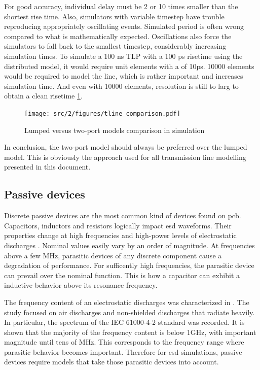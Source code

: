 For good accuracy, individual delay must be 2 or 10 times smaller than the shortest rise time.
Also, simulators with variable timestep have trouble reproducing appropriately oscillating events.
Simulated period is often wrong compared to what is mathematically expected.
Oscillations also force the simulators to fall back to the smallest timestep, considerably increasing simulation times.
To simulate a 100 ns TLP with a 100 ps risetime using the distributed model, it would require unit elements with a of 10ps.
10000 elements would be required to model the line, which is rather important and increases simulation time.
And even with 10000 elements, resolution is still to larg to obtain a clean risetime \ref{fig:lines-simulations}.

\begin{figure}[!h]
  \centering
  \texttt{[image: src/2/figures/tline\_comparison.pdf]}
  \caption{Lumped versus two-port models comparison in simulation}
  \label{fig:lines-simulations}
\end{figure}

In conclusion, the two-port model should always be preferred over the lumped model.
This is obviously the approach used for all transmission line modelling presented in this document.

\subsection{Passive devices}

Discrete passive devices are the most common kind of devices found on \gls{pcb}.
Capacitors, inductors and resistors logically impact \gls{esd} waveforms.
Their properties change at high frequencies and high-power levels of electrostatic discharges \cite{capa-esd-cz}.
Nominal values easily vary by an order of magnitude.
At frequencies above a few MHz, parasitic devices of any discrete component cause a degradation of performance.
For sufficently high frequencies, the parasitic device can prevail over the nominal function.
This is how a capacitor can exhibit a inductive behavior above its resonance frequency.

The frequency content of an electrostatic discharges was characterized in \cite{fft-esd}.
The study focused on air discharges and non-shielded discharges that radiate heavily.
In particular, the spectrum of the IEC 61000-4-2 standard \cite{iec61000-4-2} was recorded.
It is shown that the majority of the frequency content is below 1GHz, with important magnitude until tens of MHz.
This corresponds to the frequency range where parasitic behavior becomes important.
Therefore for \gls{esd} simulations, passive devices require models that take those parasitic devices into account.

